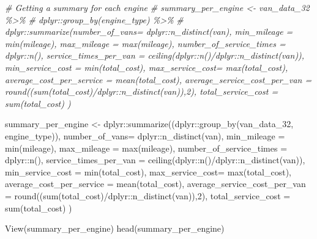\documentclass[
]{article}
\newenvironment{Shaded}{\begin{snugshade}}{\end{snugshade}}
\newcommand{\AttributeTok}[1]{\textcolor[rgb]{0.77,0.63,0.00}{#1}}
\newcommand{\CommentTok}[1]{\textcolor[rgb]{0.56,0.35,0.01}{\textit{#1}}}
\newcommand{\DecValTok}[1]{\textcolor[rgb]{0.00,0.00,0.81}{#1}}
\newcommand{\FunctionTok}[1]{\textcolor[rgb]{0.00,0.00,0.00}{#1}}
\newcommand{\NormalTok}[1]{#1}
\newcommand{\OtherTok}[1]{\textcolor[rgb]{0.56,0.35,0.01}{#1}}
\newcommand{\SpecialCharTok}[1]{\textcolor[rgb]{0.00,0.00,0.00}{#1}}
\begin{document}
\begin{Shaded}
\begin{Highlighting}[]
\CommentTok{\# Getting a summary for each engine }
\CommentTok{\# summary\_per\_engine \textless{}{-} van\_data\_32 \%\textgreater{}\%}
\CommentTok{\#   dplyr::group\_by(engine\_type) \%\textgreater{}\%}
\CommentTok{\#   dplyr::summarize(number\_of\_vans= dplyr::n\_distinct(van), min\_mileage = min(mileage), max\_mileage = max(mileage),  number\_of\_service\_times = dplyr::n(), service\_times\_per\_van = ceiling(dplyr::n()/dplyr::n\_distinct(van)), min\_service\_cost = min(total\_cost), max\_service\_cost= max(total\_cost), average\_cost\_per\_service = mean(total\_cost), average\_service\_cost\_per\_van = round((sum(total\_cost)/dplyr::n\_distinct(van)),2), total\_service\_cost = sum(total\_cost) )}


\NormalTok{summary\_per\_engine }\OtherTok{\textless{}{-}}\NormalTok{ dplyr}\SpecialCharTok{::}\FunctionTok{summarize}\NormalTok{((dplyr}\SpecialCharTok{::}\FunctionTok{group\_by}\NormalTok{(van\_data\_32, engine\_type)), }\AttributeTok{number\_of\_vans=}\NormalTok{ dplyr}\SpecialCharTok{::}\FunctionTok{n\_distinct}\NormalTok{(van), }\AttributeTok{min\_mileage =} \FunctionTok{min}\NormalTok{(mileage), }\AttributeTok{max\_mileage =} \FunctionTok{max}\NormalTok{(mileage),  }\AttributeTok{number\_of\_service\_times =}\NormalTok{ dplyr}\SpecialCharTok{::}\FunctionTok{n}\NormalTok{(), }\AttributeTok{service\_times\_per\_van =} \FunctionTok{ceiling}\NormalTok{(dplyr}\SpecialCharTok{::}\FunctionTok{n}\NormalTok{()}\SpecialCharTok{/}\NormalTok{dplyr}\SpecialCharTok{::}\FunctionTok{n\_distinct}\NormalTok{(van)), }\AttributeTok{min\_service\_cost =} \FunctionTok{min}\NormalTok{(total\_cost), }\AttributeTok{max\_service\_cost=} \FunctionTok{max}\NormalTok{(total\_cost), }\AttributeTok{average\_cost\_per\_service =} \FunctionTok{mean}\NormalTok{(total\_cost), }\AttributeTok{average\_service\_cost\_per\_van =} \FunctionTok{round}\NormalTok{((}\FunctionTok{sum}\NormalTok{(total\_cost)}\SpecialCharTok{/}\NormalTok{dplyr}\SpecialCharTok{::}\FunctionTok{n\_distinct}\NormalTok{(van)),}\DecValTok{2}\NormalTok{), }\AttributeTok{total\_service\_cost =} \FunctionTok{sum}\NormalTok{(total\_cost) )}

\FunctionTok{View}\NormalTok{(summary\_per\_engine)}
\FunctionTok{head}\NormalTok{(summary\_per\_engine)}
\end{Highlighting}
\end{Shaded}
\end{document}
